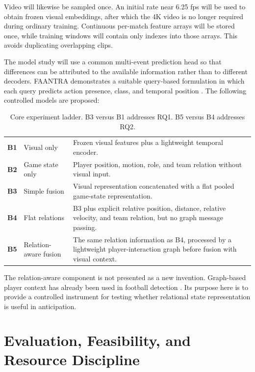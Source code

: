 \documentclass[11pt,a4paper]{article}
\begin{document}
Video will likewise be sampled once. An initial rate near 6.25 fps will be used to obtain frozen visual embeddings, after which the 4K video is no longer required during ordinary training. Continuous per-match feature arrays will be stored once, while training windows will contain only indexes into those arrays. This avoids duplicating overlapping clips.

The model study will use a common multi-event prediction head so that differences can be attributed to the available information rather than to different decoders. FAANTRA demonstrates a suitable query-based formulation in which each query predicts action presence, class, and temporal position \cite{dalal2025faantra}. The following controlled models are proposed:

\begin{table}[H]
\centering
\small
\begin{tabularx}{\textwidth}{>{\bfseries}p{1.2cm} p{3.2cm} X}
\toprule
B1 & Visual only & Frozen visual features plus a lightweight temporal encoder.\\
B2 & Game state only & Player position, motion, role, and team relation without visual input.\\
B3 & Simple fusion & Visual representation concatenated with a flat pooled game-state representation.\\
B4 & Flat relations & B3 plus explicit relative position, distance, relative velocity, and team relation, but no graph message passing.\\
B5 & Relation-aware fusion & The same relation information as B4, processed by a lightweight player-interaction graph before fusion with visual context.\\
\bottomrule
\end{tabularx}
\caption{Core experiment ladder. B3 versus B1 addresses RQ1. B5 versus B4 addresses RQ2.}
\end{table}

The relation-aware component is not presented as a new invention. Graph-based player context has already been used in football detection \cite{ochin2025gs}. Its purpose here is to provide a controlled instrument for testing whether relational state representation is useful in anticipation.

\section{Evaluation, Feasibility, and Resource Discipline}
\end{document}
